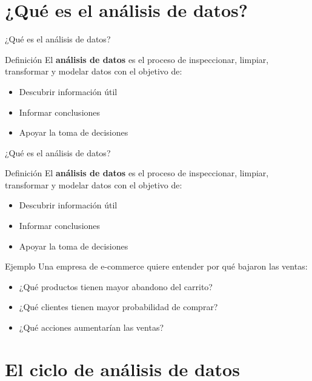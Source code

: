 \documentclass{beamer}
\begin{document}
\section{¿Qué es el análisis de datos?}

\begin{frame}{¿Qué es el análisis de datos?}
\begin{block}{Definición}
El \textbf{análisis de datos} es el proceso de inspeccionar, limpiar, transformar y modelar datos con el objetivo de:
\begin{itemize}
    \item Descubrir información útil
    \item Informar conclusiones
    \item Apoyar la toma de decisiones
\end{itemize}
\end{block}
\end{frame}

\begin{frame}{¿Qué es el análisis de datos?}
\begin{block}{Definición}
El \textbf{análisis de datos} es el proceso de inspeccionar, limpiar, transformar y modelar datos con el objetivo de:
\begin{itemize}
    \item Descubrir información útil
    \item Informar conclusiones
    \item Apoyar la toma de decisiones
\end{itemize}
\end{block}

\begin{exampleblock}{Ejemplo}
Una empresa de e-commerce quiere entender por qué bajaron las ventas:
\begin{itemize}
    \item ¿Qué productos tienen mayor abandono del carrito?
    \item ¿Qué clientes tienen mayor probabilidad de comprar?
    \item ¿Qué acciones aumentarían las ventas?
\end{itemize}
\end{exampleblock}
\end{frame}

\section{El ciclo de análisis de datos}
\end{document}
